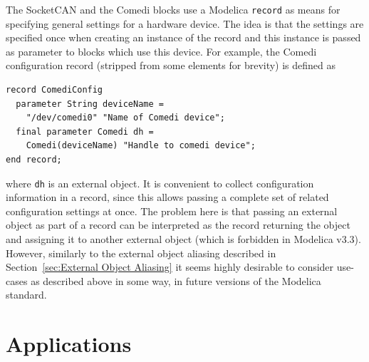 \documentclass{resources/modelica}
\newcommand{\modelica}[1]{\lstinline[language=modelica]|#1|}
\begin{document}
The SocketCAN and the Comedi blocks use a Modelica \modelica{record} as means
for specifying general settings for a hardware device. The idea is that the
settings are specified once when creating an instance of the record and
this instance is passed as parameter to blocks which use this device. For
example, the Comedi configuration record (stripped from some elements for brevity) is defined
as
\begin{lstlisting}[language=modelica]
record ComediConfig
  parameter String deviceName =
    "/dev/comedi0" "Name of Comedi device";
  final parameter Comedi dh =
    Comedi(deviceName) "Handle to comedi device";
end record;
\end{lstlisting}
where \modelica{dh} is an external object. It is convenient to collect
configuration information in a record, since this allows passing a complete set
of related configuration settings at once. The problem here is that passing an
external object as part of a record can be interpreted as the record returning
the object and assigning it to another external object (which is forbidden in
Modelica v3.3). However, similarly to the external object aliasing described in
Section~\ref{sec:External Object Aliasing} it seems highly desirable to consider
use-cases as described above in some way,  in future versions of the Modelica
standard.



\section{Applications}
\label{sec:Applications}
\end{document}
